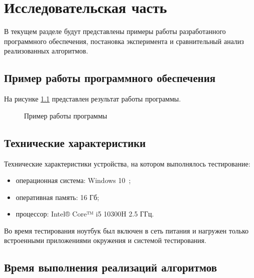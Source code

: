\chapter{Исследовательская часть}
В текущем разделе будут представлены примеры работы разработанного программного обеспечения, постановка эксперимента и сравнительный анализ реализованных алгоритмов.

\section{Пример работы программного обеспечения}

На рисунке \ref{fig:prog_exmpl} представлен результат работы программы.

\begin{figure}[h!]
	
	
	\caption{Пример работы программы}
	
	\label{fig:prog_exmpl}
	
\end{figure}

\section{Технические характеристики}

Технические характеристики устройства, на котором выполнялось тестирование:

\begin{itemize}
	\item операционная система: Windows 10~\cite{windows10};
	\item оперативная память: 16 Гб;
	\item процессор: Intel® Core™ i5 10300H 2.5 ГГц.
\end{itemize}

Во время тестирования ноутбук был включен в сеть питания и нагружен только встроенными приложениями окружения и системой тестирования.

\section{Время выполнения реализаций алгоритмов}

